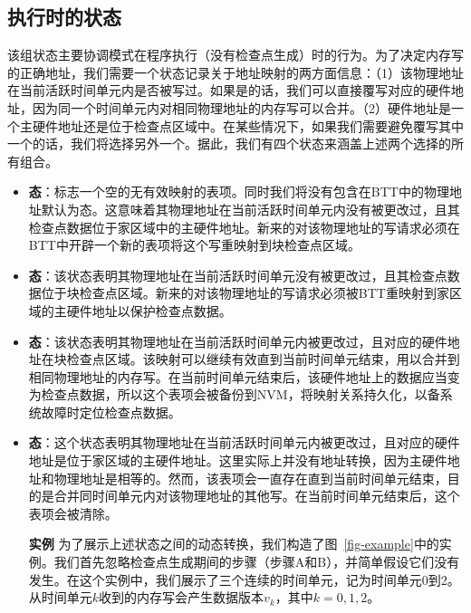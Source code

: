 \subsection{执行时的状态}

该组状态主要协调模式在程序执行（没有检查点生成）时的行为。为了决定内存写的正确地址，我们需要一个状态记录关于地址映射的两方面信息：（1）该物理地址在当前活跃时间单元内是否被写过。如果是的话，我们可以直接覆写对应的硬件地址，因为同一个时间单元内对相同物理地址的内存写可以合并。（2）硬件地址是一个主硬件地址还是位于检查点区域中。在某些情况下，如果我们需要避免覆写其中一个的话，我们将选择另外一个。据此，我们有四个状态来涵盖上述两个选择的所有组合。

\begin{itemize}
\item \textbf{态}：标志一个空的无有效映射的表项。同时我们将没有包含在BTT中的物理地址默认为态。这意味着其物理地址在当前活跃时间单元内没有被更改过，且其检查点数据位于家区域中的主硬件地址。新来的对该物理地址的写请求必须在BTT中开辟一个新的表项将这个写重映射到块检查点区域。

\item \textbf{态}：该状态表明其物理地址在当前活跃时间单元没有被更改过，且其检查点数据位于块检查点区域。新来的对该物理地址的写请求必须被BTT重映射到家区域的主硬件地址以保护检查点数据。

\item \textbf{态}：该状态表明其物理地址在当前活跃时间单元内被更改过，且对应的硬件地址在块检查点区域。该映射可以继续有效直到当前时间单元结束，用以合并到相同物理地址的内存写。在当前时间单元结束后，该硬件地址上的数据应当变为检查点数据，所以这个表项会被备份到NVM，将映射关系持久化，以备系统故障时定位检查点数据。

\item \textbf{态}：这个状态表明其物理地址在当前活跃时间单元内被更改过，且对应的硬件地址是位于家区域的主硬件地址。这里实际上并没有地址转换，因为主硬件地址和物理地址是相等的。然而，该表项会一直存在直到当前时间单元结束，目的是合并同时间单元内对该物理地址的其他写。在当前时间单元结束后，这个表项会被清除。


\vspace{\noindentsep}
\noindent \textbf{实例  }为了展示上述状态之间的动态转换，我们构造了图~\ref{fig-example}中的实例。我们首先忽略检查点生成期间的步骤（步骤A和B），并简单假设它们没有发生。在这个实例中，我们展示了三个连续的时间单元，记为时间单元0到2。从时间单元$k$收到的内存写会产生数据版本$v_k$，其中$k = 0, 1, 2$。


\end{itemize}
